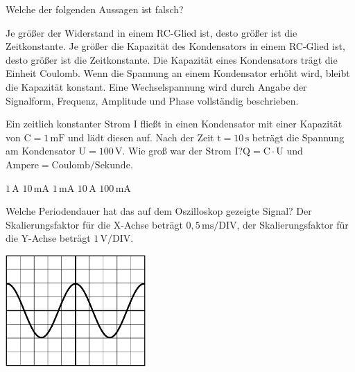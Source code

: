 \documentclass[11pt]{exam}
\begin{document}
\setlength{\voffset}{-0.5in}
\setlength{\headsep}{5pt}

\hspace{2mm}
 \hspace{5mm}
\vspace{4mm}

\begin{questions}

\question Welche der folgenden Aussagen ist falsch?

\begin{choices}
	\choice Je größer der Widerstand in einem RC-Glied ist, desto größer ist die Zeitkonstante.
	\choice Je größer die Kapazität des Kondensators in einem RC-Glied ist, desto größer ist die Zeitkonstante.
	\choice Die Kapazität eines Kondensators trägt die Einheit Coulomb.
	\choice Wenn die Spannung an einem Kondensator erhöht wird, bleibt die Kapazität konstant.
	\choice Eine Wechselspannung wird durch Angabe der Signalform, Frequenz, Amplitude und Phase vollständig beschrieben.
\end{choices}

\vspace{3mm}\question Ein zeitlich konstanter Strom \(\mathrm{I}\) fließt in einen Kondensator mit einer Kapazität von \(\mathrm{C=1\,mF}\) und lädt diesen auf. Nach der Zeit \(\mathrm{t=10\,s}\) beträgt die Spannung am Kondensator \(\mathrm{U=100\,V}\). Wie groß war der Strom \(\mathrm{I}\)?\(\mathrm{Q=C \cdot U}\) und \(\mathrm{Ampere=Coulomb/Sekunde}\).

\begin{choices}
	\choice \(\mathrm{1\,A}\)
	\choice \(\mathrm{10\,mA}\)
	\choice \(\mathrm{1\,mA}\)
	\choice \(\mathrm{10\,A}\)
	\choice \(\mathrm{100\,mA}\)
\end{choices}

\vspace{3mm}\question Welche Periodendauer hat das auf dem Oszilloskop gezeigte Signal? Der Skalierungsfaktor für die X-Achse beträgt \(\mathrm{0,5\,ms/DIV}\), der Skalierungsfaktor für die Y-Achse beträgt \(\mathrm{1\,V/DIV}\). 

\includegraphics[width=0.4\textwidth]{images/Oszi2.png}


\end{questions}
\end{document}
